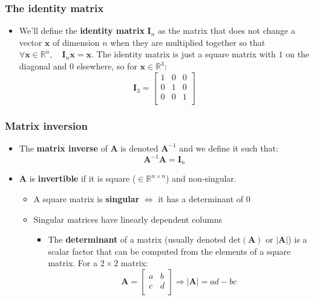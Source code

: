 \documentclass{article}
\begin{document}
\begin{multicols*}{2}
\subsubsection{The identity matrix}
\begin{itemize}
    \item We'll define the \textbf{identity matrix} $\bm{I}_n$ as the matrix that does not change a vector $\bm{x}$ of dimension $n$ when they are multiplied together so that $\forall \bm{x} \in \mathbb{R}^n, \quad \bm{I}_n\bm{x}=\bm{x}$. The identity matrix is just a square matrix with $1$ on the diagonal and $0$ elsewhere, so for $\bm{x} \in \mathbb{R}^3$:
     $$ \bm{I}_3 = \begin{bmatrix}
    1 & 0 & 0 \\
    0 & 1 & 0 \\
    0 & 0 & 1 \\ \end{bmatrix} $$\end{itemize}


\subsubsection{Matrix inversion}
\begin{itemize}
    \item The \textbf{matrix inverse} of $\bm{A}$ is denoted $\bm{A}^{-1}$ and we define it such that:
    $$ \bm{A}^{-1}\bm{A} = \bm{I}_n$$
    \item $\bm{A}$ is \textbf{invertible} if it is square ($\in \mathbb{R}^{n \times n}$) and non-singular.
    \begin{itemize}
        \item A square matrix is \textbf{singular} $\iff$  it has a determinant of $0$
        \item Singular matrices have linearly dependent columns
        \begin{itemize}
            \item The \textbf{determinant} of a matrix (usually denoted $\mathrm{det}(\bm{A})$ or $\vert \bm{A}\vert$) is a scalar factor that can be computed from the elements of a square matrix. For a $2\times 2$ matrix:
            $$ \bm{A} =
            \begin{bmatrix}
            a & b \\
            c & d \\ \end{bmatrix}
            \Rightarrow \vert \bm{A} \vert = ad-bc $$
            \end{itemize}
\end{itemize}
\end{itemize}

\end{multicols*}
\end{document}
